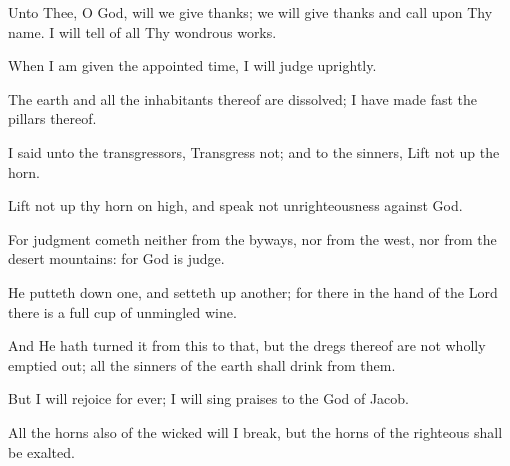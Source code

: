 Unto Thee, O God, will we give thanks; we will give thanks and call upon Thy name. I will tell of all Thy wondrous works.

When I am given the appointed time, I will judge uprightly.

The earth and all the inhabitants thereof are dissolved; I have made fast the pillars thereof.

I said unto the transgressors, Transgress not; and to the sinners, Lift not up the horn.

Lift not up thy horn on high, and speak not unrighteousness against God.

For judgment cometh neither from the byways, nor from the west, nor from the desert mountains: for God is judge.

He putteth down one, and setteth up another; for there in the hand of the Lord there is a full cup of unmingled wine.

And He hath turned it from this to that, but the dregs thereof are not wholly emptied out; all the sinners of the earth shall drink from them.

But I will rejoice for ever; I will sing praises to the God of Jacob.

All the horns also of the wicked will I break, but the horns of the righteous shall be exalted.
